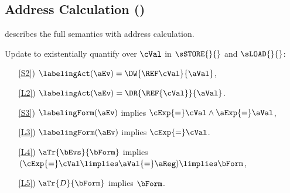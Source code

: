\subsection{Address Calculation (\xADDR)}
 describes the full semantics with address calculation.
\begin{definition}[\xADDR]
  \label{def:pomsets-addr}
  Update  to existentially quantify over $\cVal$
  in $\sSTORE{}{}$ and $\sLOAD{}{}$:
  \begin{enumerate}
  \item[\ref{S2})] $\labelingAct(\aEv) = \DW{\REF\cVal}{\aVal}$,
  \item[\ref{L2})] $\labelingAct(\aEv) = \DR{\REF{\cVal}}{\aVal}$.
  \end{enumerate}

  \begin{enumerate}
  \item[\ref{S3})] $\labelingForm(\aEv)$ implies $\cExp{=}\cVal \land \aExp{=}\aVal$,
  \item[\ref{L3})] $\labelingForm(\aEv)$ implies $\cExp{=}\cVal$.
  \end{enumerate}

  \begin{enumerate}
  \item[\ref{L4})] $\aTr{\bEvs}{\bForm}$ implies $(\cExp{=}\cVal\limplies\aVal{=}\aReg)\limplies\bForm$, 
  \item[\ref{L5})] $\aTr{\cEvs}{\bForm}$ implies $\bForm$.
  \end{enumerate}  
\end{definition}

